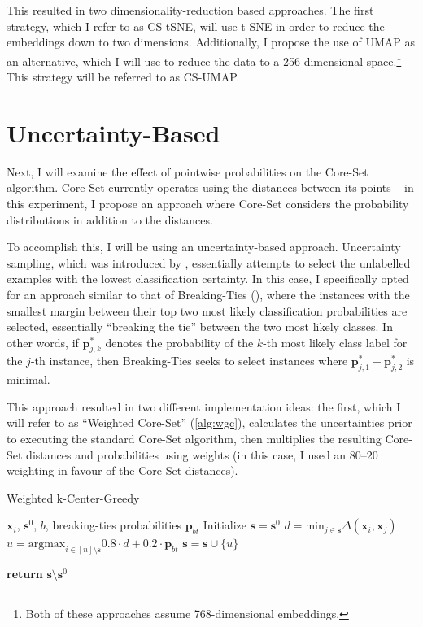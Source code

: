 \documentclass[english,bachelor,ul]{webisthesis} %
\begin{document}
This resulted in two dimensionality-reduction based approaches. The first strategy, which I refer to as CS-tSNE, will use t-SNE in order to reduce the embeddings down to two dimensions. Additionally, I propose the use of UMAP as an alternative, which I will use to reduce the data to a 256-dimensional space.\footnote{Both of these approaches assume 768-dimensional embeddings.} This strategy will be referred to as CS-UMAP. 

\section{Uncertainty-Based}

Next, I will examine the effect of pointwise probabilities on the Core-Set algorithm. Core-Set currently operates using the distances between its points -- in this experiment, I propose an approach where Core-Set considers the probability distributions in addition to the distances. 

To accomplish this, I will be using an uncertainty-based approach. Uncertainty sampling, which was introduced by \cite{DBLP:conf/sigir/LewisG94}, essentially attempts to select the unlabelled examples with the lowest classification certainty. In this case, I specifically opted for an approach similar to that of Breaking-Ties (\cite{DBLP:journals/jmlr/LuoKGHSRH05}), where the instances with the smallest margin between their top two most likely classification probabilities are selected, essentially ``breaking the tie'' between the two most likely classes. In other words, if $ \mathbf{p}_{j, k}^* $ denotes the probability of the $ k $-th most likely class label for the $ j $-th instance, then Breaking-Ties seeks to select instances where $ \mathbf{p}_{j, 1}^* - \mathbf{p}_{j, 2}^* $ is minimal.

This approach resulted in two different implementation ideas: the first, which I will refer to as ``Weighted Core-Set'' (\ref{alg:wgc}), calculates the uncertainties prior to executing the standard Core-Set algorithm, then multiplies the resulting Core-Set distances and probabilities using weights (in this case, I used an 80--20 weighting in favour of the Core-Set distances). 

\begin{algorithm}[htpb]
\caption{Weighted k-Center-Greedy}%
\makeatletter{}\makeatother
\label{alg:wgc}
\begin{algorithmic}


\Require $ \mathbf{x}_i $, $ \mathbf{s}^0 $, $ b $, breaking-ties probabilities $ \mathbf{p}_{bt} $
\State Initialize $ \mathbf{s} = \mathbf{s}^0 $
\Repeat
\State $ d = \text{min}_{j \in \mathbf{s}} \Delta(\mathbf{x}_i, \mathbf{x}_j) $ 
    \State $ u = \text{argmax}_{i \in [n] \setminus \mathbf{s}} 0.8 \cdot d + 0.2 \cdot \mathbf{p}_{bt} $
\State $ \mathbf{s} = \mathbf{s} \cup \{u\} $

\State \textbf{return} $\mathbf{s} \setminus \mathbf{s}^0 $
\end{algorithmic}
\end{algorithm}
\end{document}
